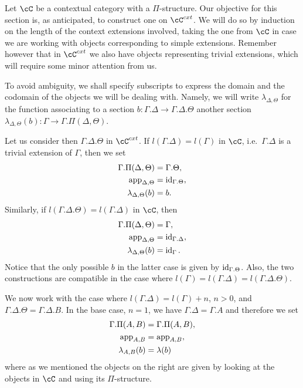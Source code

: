 \documentclass[a4paper,fontsize=12pt]{scrartcl}
\begin{document}
\begin{construction}
  Let $\cC$ be a contextual category with a $\Pi$-structure. Our objective for
  this section is, as anticipated, to construct one on $\cC^{cxt}$. We will do
  so by induction on the length of the context extensions involved, taking the
  one from $\cC$ in case we are working with objects corresponding to simple
  extensions. Remember however that in $\cC^{cxt}$ we also have objects
  representing trivial extensions, which will require some minor attention from
  us.

  To avoid ambiguity, we shall specify subscripts to express the domain and the
  codomain of the objects we will be dealing with. Namely, we will write
  $\lambda_{\Delta,\Theta}$ for the function associating to a section
  $b\colon\Gamma.\Delta\rightarrow\Gamma.\Delta.\Theta$ another section
  $\lambda_{\Delta,\Theta}(b)\colon\Gamma\rightarrow\Gamma.\Pi(\Delta,\Theta)$.

  Let us consider then $\Gamma.\Delta.\Theta$ in $\cC^{cxt}$. If
  $l(\Gamma.\Delta)=l(\Gamma)$ in $\cC$, i.e.\ $\Gamma.\Delta$ is a trivial
  extension of $\Gamma$, then we set
  \begin{align*}
    \Gamma.\Pi(\Delta,\Theta) &=\Gamma.\Theta, \\
    \operatorname{app}_{\Delta,\Theta} &=\operatorname{id}_{\Gamma.\Theta}, \\
    \lambda_{\Delta,\Theta}(b) &=b.
  \end{align*}
  Similarly, if $l(\Gamma.\Delta.\Theta)=l(\Gamma.\Delta)$ in $\cC$, then
  \begin{align*}
    \Gamma.\Pi(\Delta,\Theta) &=\Gamma, \\
    \operatorname{app}_{\Delta,\Theta} &=\operatorname{id}_{\Gamma.\Delta}, \\
    \lambda_{\Delta,\Theta}(b) &=\operatorname{id}_\Gamma.
  \end{align*}
  Notice that the only possible $b$ in the latter case is given by
  $\operatorname{id}_{\Gamma.\Theta}$. Also, the two constructions are compatible in the case
  where $l(\Gamma)=l(\Gamma.\Delta)=l(\Gamma.\Delta.\Theta)$.

  We now work with the case where $l(\Gamma.\Delta)=l(\Gamma)+n$, $n>0$,
  and $\Gamma.\Delta.\Theta=\Gamma.\Delta.B$. In the base case, $n=1$, we have
  $\Gamma.\Delta=\Gamma.A$ and therefore we set
  \begin{align*}
    \Gamma.\Pi(A,B)&=\Gamma.\Pi(A,B), \\
    \operatorname{app}_{A,B} &=\operatorname{app}_{A,B}, \\
    \lambda_{A,B}(b) &=\lambda(b)
  \end{align*}
  where as we mentioned the objects on the right are given by looking at the
  objects in $\cC$ and using its $\Pi$-structure.


\end{construction}
\end{document}
